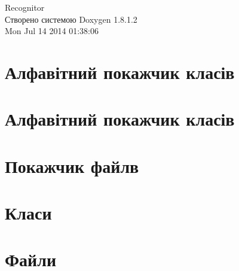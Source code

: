 \documentclass{book}
\begin{document}
\hypersetup{pageanchor=false,citecolor=blue}
\begin{titlepage}
\vspace*{7cm}
\begin{center}
{\Large Recognitor }\\
\vspace*{1cm}
{\large Створено системою Doxygen 1.8.1.2}\\
\vspace*{0.5cm}
{\small Mon Jul 14 2014 01:38:06}\\
\end{center}
\end{titlepage}
\clearemptydoublepage
{}
\tableofcontents
\clearemptydoublepage
{}
\hypersetup{pageanchor=true,citecolor=blue}
\chapter{Алфавітний покажчик класів}

\chapter{Алфавітний покажчик класів}

\chapter{Покажчик файлв}

\chapter{Класи}



















\chapter{Файли}





















\printindex
\end{document}
